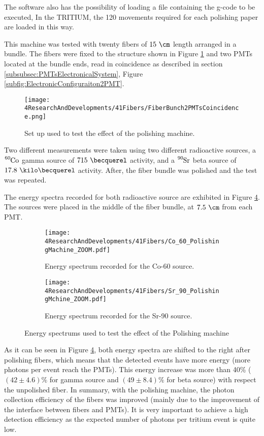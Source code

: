 The software also has the possibility of loading a file containing the g-code to be executed, In the TRITIUM, the 120 movements required for each polishing paper are loaded in this way. 

This machine was tested with twenty fibers of $15~\cm$ length arranged in a bundle. The fibers were fixed to the structure shown in Figure \ref{fig:BunchWith2PMTsCoincidence} and two PMTs located at the bundle ends, read in coincidence as described in section \ref{subsubsec:PMTsElectronicalSystem}, Figure \ref{subfig:ElectronicConfiguraiton2PMT}.

\begin{figure}[]
\centering
\texttt{[image: 4ResearchAndDevelopments/41Fibers/FiberBunch2PMTsCoincidence.png]}
\caption{Set up used to test the effect of the polishing machine.\label{fig:BunchWith2PMTsCoincidence}}
\end{figure}

Two different measurements were taken using two different radioactive sources, a $\ce{^{60}Co}$ gamma source of $715~\becquerel$ activity, and a $\ce{^{90}Sr}$ beta source of $17.8~\kilo\becquerel$ activity. After, the fiber bundle was polished and the test was repeated.

The energy spectra recorded for both radioactive source are exhibited in Figure \ref{fig:ResultsOfPolishingMachine}. The sources were placed in the middle of the fiber bundle, at $7.5~\cm$ from each PMT.

\begin{figure}
\centering
    \begin{subfigure}[b]{0.76\textwidth}
    \centering
    \texttt{[image: 4ResearchAndDevelopments/41Fibers/Co\_60\_PolishingMachine\_ZOOM.pdf]}  
    \caption{Energy spectrum recorded for the Co-60 source.\label{subfig:EnergySpectrumCo60PolishingTest}}
    \end{subfigure}
    \hfill
    \begin{subfigure}[b]{0.76\textwidth}
    \centering
    \texttt{[image: 4ResearchAndDevelopments/41Fibers/Sr\_90\_PolishingMchine\_ZOOM.pdf]}  
    \caption{Energy spectrum recorded for the Sr-90 source.\label{subfig:EnergySpectrumSr90PolishingTest}}
    \end{subfigure}
 \caption{Energy spectrums used to test the effect of the Polishing machine}
 \label{fig:ResultsOfPolishingMachine}
\end{figure}

As it can be seen in Figure \ref{fig:ResultsOfPolishingMachine}, both energy spectra are shifted to the right after polishing fibers, which means that the detected events have more energy (more photons per event reach the PMTs). This energy increase was more than 40\% ($(42 \pm 4.6)\%$ for gamma source and $(49 \pm 8.4)\%$ for beta source) with respect the unpolished fiber. In summary, with the polishing machine, the photon collection efficiency of the fibers was improved  (mainly due to the improvement of the interface between fibers and PMTs). It is very important to achieve a high detection efficiency as the expected number of photons per tritium event is quite low.